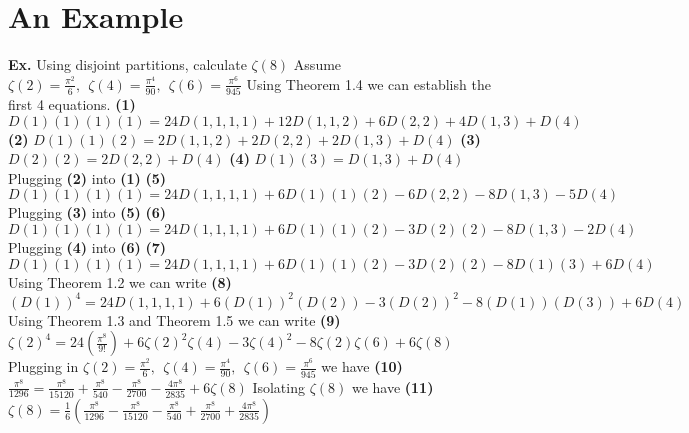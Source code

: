\documentclass[12pt]{article}
\begin{document}
\section{An Example}
\textbf{Ex.} Using disjoint partitions, calculate \(\zeta(8)\)
\newline
Assume \(\zeta(2)=\frac{\pi^2}{6},\ \ \zeta(4)=\frac{\pi^4}{90},\ \ \zeta(6)=\frac{\pi^6}{945}\) \newline \newline
Using Theorem 1.4 we can establish the first 4 equations. \newline
\textbf{(1)} \(D(1)(1)(1)(1) = 24D(1,1,1,1)+12D(1,1,2)+6D(2,2)+4D(1,3)+D(4)\)
\newline
\textbf{(2)} \(D(1)(1)(2) = 2D(1,1,2) + 2D(2,2) + 2D(1,3) + D(4)\)
\newline
\textbf{(3)} \(D(2)(2) = 2D(2,2) + D(4)\)
\newline
\textbf{(4)} \(D(1)(3) = D(1,3) + D(4)\)
\newline \newline
Plugging \textbf{(2)} into \textbf{(1)}
\newline
\textbf{(5)}\ \(D(1)(1)(1)(1) = 24D(1,1,1,1) + 6D(1)(1)(2) - 6D(2,2) - 8D(1,3) -5D(4)\)
\newline
Plugging \textbf{(3)} into \textbf{(5)}
\newline
\textbf{(6)}\ \(D(1)(1)(1)(1) = 24D(1,1,1,1) + 6D(1)(1)(2) - 3D(2)(2) - 8D(1,3) -2D(4)\)
\newline
Plugging \textbf{(4)} into \textbf{(6)}
\newline
\textbf{(7)}\ \(D(1)(1)(1)(1) = 24D(1,1,1,1) + 6D(1)(1)(2) - 3D(2)(2) - 8D(1)(3) +6D(4)\)
\newline
\newline
Using Theorem 1.2 we can write
\newline
\textbf{(8)}\ \((D(1))^4=24D(1,1,1,1)+6(D(1))^2(D(2))-3(D(2))^2-8(D(1))(D(3))+6D(4)\) \newline
Using Theorem 1.3 and Theorem 1.5 we can write \newline
\textbf{(9)}\ \(\zeta(2)^4=24\left(\frac{\pi^8}{9!}\right)+6\zeta(2)^2\zeta(4)-3\zeta(4)^2-8\zeta(2)\zeta(6)+6\zeta(8)\)
\newline
Plugging in \(\zeta(2)=\frac{\pi^2}{6},\ \ \zeta(4)=\frac{\pi^4}{90},\ \ \zeta(6)=\frac{\pi^6}{945}\) we have
\newline
\textbf{(10)}\ \(\frac{\pi^8}{1296}=\frac{\pi^8}{15120}+\frac{\pi^8}{540}-\frac{\pi^8}{2700}-\frac{4\pi^8}{2835}+6\zeta(8)\)
\newline
Isolating \(\zeta(8)\) we have \newline
\textbf{(11)}\ \(\zeta(8)=\frac{1}{6}\left(\frac{\pi^8}{1296}-\frac{\pi^8}{15120}-\frac{\pi^8}{540}+\frac{\pi^8}{2700}+\frac{4\pi^8}{2835}\right)\)
\newline \newline
{}
\newpage
\end{document}
